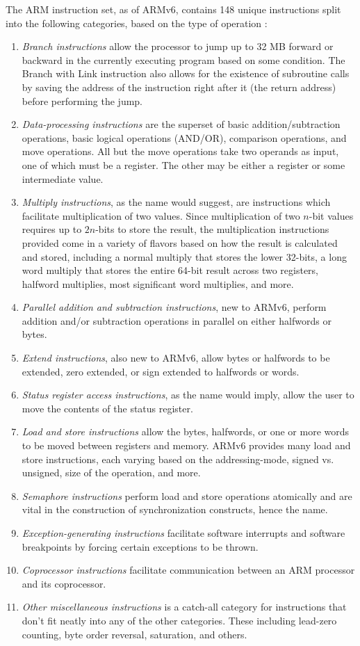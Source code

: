 \documentclass[onecolumn, draftclsnofoot, 10pt, compsoc]{IEEEtran}
\begin{document}
The ARM instruction set, as of ARMv6, contains 148 unique instructions split into the following categories, based on the type of operation \cite{armreference}:
\begin{enumerate}
\item \textit{Branch instructions} allow the processor to jump up to 32 MB forward or backward in the currently executing program based on some condition. The Branch with Link instruction also allows for the existence of subroutine calls by saving the address of the instruction right after it (the return address) before performing the jump.
\item \textit{Data-processing instructions} are the superset of basic addition/subtraction operations, basic logical operations (AND/OR), comparison operations, and move operations. All but the move operations take two operands as input, one of which must be a register. The other may be either a register or some intermediate value. 
\item \textit{Multiply instructions}, as the name would suggest, are instructions which facilitate multiplication of two values. Since multiplication of two $n$-bit values requires up to $2n$-bits to store the result, the multiplication instructions provided come in a variety of flavors based on how the result is calculated and stored, including a normal multiply that stores the lower 32-bits, a long word multiply that stores the entire 64-bit result across two registers, halfword multiplies, most significant word multiplies, and more.
\item \textit{Parallel addition and subtraction instructions}, new to ARMv6, perform addition and/or subtraction operations in parallel on either halfwords or bytes.
\item \textit{Extend instructions}, also new to ARMv6, allow bytes or halfwords to be extended, zero extended, or sign extended to halfwords or words.
\item \textit{Status register access instructions}, as the name would imply, allow the user to move the contents of the status register.
\item \textit{Load and store instructions} allow the bytes, halfwords, or one or more words to be moved between registers and memory. ARMv6 provides many load and store instructions, each varying based on the addressing-mode, signed vs. unsigned, size of the operation, and more.
\item \textit{Semaphore instructions} perform load and store operations atomically and are vital in the construction of synchronization constructs, hence the name.
\item \textit{Exception-generating instructions} facilitate software interrupts and software breakpoints by forcing certain exceptions to be thrown.
\item \textit{Coprocessor instructions} facilitate communication between an ARM processor and its coprocessor.
\item \textit{Other miscellaneous instructions} is a catch-all category for instructions that don't fit neatly into any of the other categories. These including lead-zero counting, byte order reversal, saturation, and others.
\end{enumerate}
\end{document}
